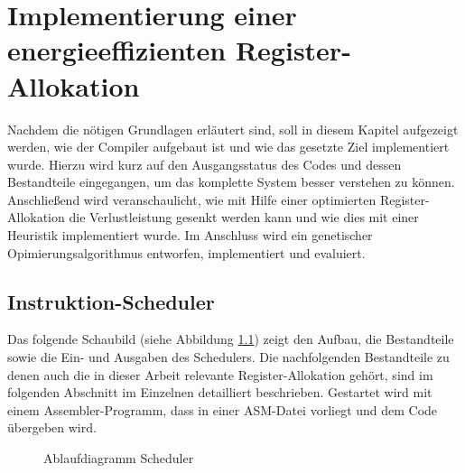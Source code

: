 \chapter{Implementierung einer energieeffizienten Register-Allokation}
\label{chap:Implementierung}
Nachdem die nötigen Grundlagen erläutert sind, soll in diesem Kapitel aufgezeigt werden, wie der Compiler aufgebaut ist und wie das gesetzte Ziel implementiert wurde. Hierzu wird kurz auf den Ausgangsstatus des Codes und dessen Bestandteile eingegangen, um das komplette System besser verstehen zu können. Anschließend wird veranschaulicht, wie mit Hilfe einer optimierten Register-Allokation die Verlustleistung gesenkt werden kann und wie dies mit einer Heuristik implementiert wurde. Im Anschluss wird ein genetischer Opimierungsalgorithmus entworfen, implementiert und evaluiert.
\newpage
\section{Instruktion-Scheduler}
 Das folgende Schaubild (siehe Abbildung \ref{fig:flow_compiler}) zeigt den Aufbau, die Bestandteile sowie die Ein- und Ausgaben des Schedulers. Die nachfolgenden Bestandteile zu denen auch die in dieser Arbeit relevante Register-Allokation gehört, sind im folgenden Abschnitt im Einzelnen detailliert beschrieben.
 Gestartet wird mit einem Assembler-Programm, dass in einer ASM-Datei vorliegt und dem Code übergeben wird.
 
 
%			


	\begin{figure}[H] 
		\centering
		
		\caption{Ablaufdiagramm Scheduler}
		\label{fig:flow_compiler}
	\end{figure}

